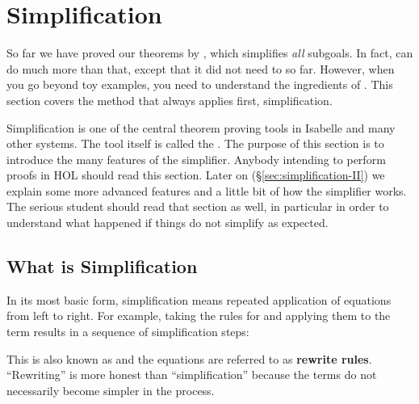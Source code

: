\section{Simplification}
\label{sec:Simplification}

So far we have proved our theorems by , which simplifies
\emph{all} subgoals. In fact,  can do much more than that, except
that it did not need to so far. However, when you go beyond toy examples, you
need to understand the ingredients of .  This section covers the
method that  always applies first, simplification.

Simplification is one of the central theorem proving tools in Isabelle and
many other systems. The tool itself is called the . The
purpose of this section is to introduce the many features of the simplifier.
Anybody intending to perform proofs in HOL should read this section. Later on
({\S}\ref{sec:simplification-II}) we explain some more advanced features and a
little bit of how the simplifier works. The serious student should read that
section as well, in particular in order to understand what happened if things
do not simplify as expected.

\subsection{What is Simplification}

In its most basic form, simplification means repeated application of
equations from left to right. For example, taking the rules for \isa{\at}
and applying them to the term \isa{[0,1] \at\ []} results in a sequence of
simplification steps:
This is also known as  and the
equations are referred to as \textbf{rewrite rules}.
``Rewriting'' is more honest than ``simplification'' because the terms do not
necessarily become simpler in the process.






\begin{exercise}
%
\end{exercise}

